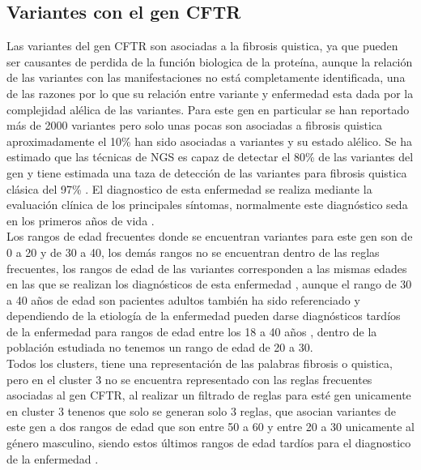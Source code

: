 \subsection{Variantes con el gen CFTR}

Las variantes del gen CFTR son asociadas a la fibrosis quistica, ya que pueden ser causantes de perdida de la función biologica de la proteína, aunque la relación de las variantes con las manifestaciones no está completamente identificada, una de las razones por lo que su relación entre variante y enfermedad esta dada por la complejidad alélica de las variantes. Para este gen en particular se han reportado más de 2000 variantes pero solo unas pocas son asociadas a fibrosis quistica aproximadamente el 10\% han sido asociadas a variantes y su estado alélico. Se ha estimado que las técnicas de NGS es capaz de detectar el 80\% de las variantes del gen y tiene estimada una taza de detección de las variantes para fibrosis quistica clásica del 97\% \cite{Rowntree2003,Terlizzi2017b,Farrell2016}. El diagnostico de esta enfermedad se realiza mediante la evaluación clínica de los principales síntomas, normalmente este diagnóstico seda en los primeros años de vida \cite{Terlizzi2017b}.\\

Los rangos de edad frecuentes donde se encuentran variantes para este gen son de 0 a 20 y de 30 a 40, los demás rangos no se encuentran dentro de las reglas frecuentes, los rangos de edad de las variantes corresponden a las mismas edades en las que se realizan los diagnósticos de esta enfermedad \cite{Terlizzi2017b}, aunque el rango de 30 a 40 años de edad son pacientes adultos también ha sido referenciado y dependiendo de la etiología de la enfermedad pueden darse diagnósticos tardíos de la enfermedad para rangos de edad entre los 18 a 40 años \cite{Farrell2008}, dentro de la población estudiada no tenemos un rango de edad de 20 a 30. \\

Todos los clusters, tiene una representación de las palabras fibrosis o quistica, pero en el cluster 3 no se encuentra representado con las reglas frecuentes asociadas al gen CFTR, al realizar un filtrado de reglas para esté gen unicamente en cluster 3 tenenos que solo se generan solo 3 reglas, que asocian variantes de este gen a dos rangos de edad que son entre 50 a 60 y entre 20 a 30 unicamente al género masculino, siendo estos últimos rangos de edad tardíos para el diagnostico de la enfermedad \cite{Farrell2008}.\\


